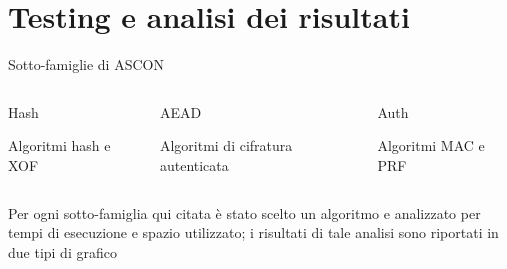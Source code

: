 \section{Testing e analisi dei risultati}


\begin{frame}{Sotto-famiglie di ASCON}
    \begin{columns}

    \begin{column}{0.28\textwidth}

    \begin{block}{Hash}
        \begin{center}
            Algoritmi hash e XOF
        \end{center}
    \end{block}

    \end{column}
    
    \begin{column}{0.38\textwidth}

    \begin{block}{AEAD}
        \begin{center}
            Algoritmi di cifratura autenticata
        \end{center}
    \end{block}

    \end{column}

    \begin{column}{0.28\textwidth}

    \begin{block}{Auth}
        \begin{center}
            Algoritmi MAC e PRF
        \end{center}
    \end{block}

    \end{column}

    \end{columns}

    \vspace{14pt}

    \begin{center}
        Per ogni sotto-famiglia qui citata è stato scelto un algoritmo e analizzato per tempi di esecuzione e spazio utilizzato; i risultati di tale analisi sono riportati in due tipi di grafico
    \end{center}


\end{frame}

